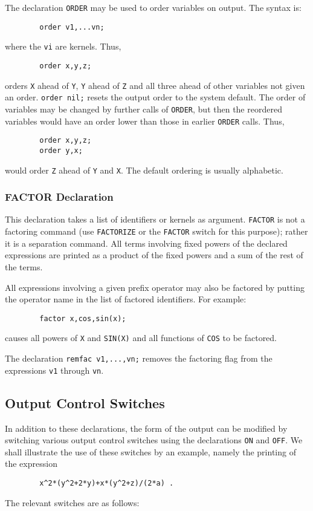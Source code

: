 The declaration {\tt ORDER} may be used to order variables
on output.  The syntax is:
\begin{verbatim}
        order v1,...vn;
\end{verbatim}
where the {\tt vi} are kernels.  Thus,
\begin{verbatim}
        order x,y,z;
\end{verbatim}
orders {\tt X} ahead of {\tt Y}, {\tt Y} ahead of {\tt Z} and all three
ahead of other variables not given an order. {\tt order nil;} resets the
output order to the system default.  The order of variables may be changed
by further calls of {\tt ORDER}, but then the reordered variables would
have an order lower than those in earlier {\tt ORDER} calls.
Thus,
\begin{verbatim}
        order x,y,z;
        order y,x;
\end{verbatim}
would order {\tt Z} ahead of {\tt Y} and {\tt X}.  The default ordering is
usually alphabetic.

\subsubsection{FACTOR Declaration}

This declaration takes a list of identifiers or kernels
as argument. {\tt FACTOR} is not a factoring command
(use {\tt FACTORIZE} or the {\tt FACTOR} switch for this purpose); rather it
is a separation command.  All terms involving fixed powers of the declared
expressions are printed as a product of the fixed powers and a sum of the
rest of the terms.

All expressions involving a given prefix operator may also be factored by
putting the operator name in the list of factored identifiers. For example:
\begin{verbatim}
        factor x,cos,sin(x);
\end{verbatim}
causes all powers of {\tt X} and {\tt SIN(X)} and all functions of
{\tt COS} to be factored.

The declaration {\tt remfac v1,...,vn;} removes the
factoring flag from the expressions {\tt v1} through {\tt vn}.

\subsection{Output Control Switches}
\label{sec-output}
In addition to these declarations, the form of the output can be modified
by switching various output control switches using the declarations
{\tt ON} and {\tt OFF}.  We shall illustrate the use of these switches by an
example, namely the printing of the expression
\begin{verbatim}
        x^2*(y^2+2*y)+x*(y^2+z)/(2*a) .
\end{verbatim}
The relevant switches are as follows:


